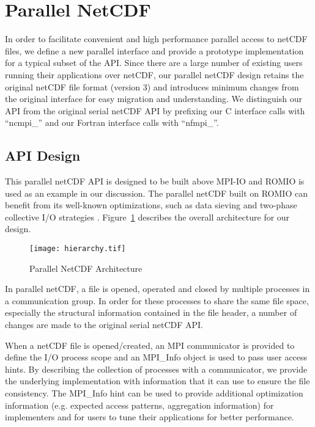 \documentclass[10pt,twocolumn]{article}          %
\begin{document}
\section{Parallel NetCDF}

In order to facilitate convenient and high performance parallel access to netCDF files, we define a
new parallel interface and provide a prototype implementation for a typical subset of the API.
Since there are a large number of existing users running their applications over netCDF, our
parallel netCDF design retains the original netCDF file format (version 3) and introduces minimum
changes from the original interface for easy migration and understanding. We distinguish our API
from the original serial netCDF API by prefixing our C interface calls with ``ncmpi\_'' and our
Fortran interface calls with ``nfmpi\_''.

\subsection{API Design}

This parallel netCDF API is designed to be built above MPI-IO and ROMIO is used as an example in
our discussion. The parallel netCDF built on ROMIO can benefit from its well-known optimizations,
such as data sieving and two-phase collective I/O strategies \cite{RoBC93, TBCP94, ThCh96,ThGL99}.
Figure~\ref{figure:hierarchy} describes the overall architecture for our design.

\begin{figure}
\begin{center}
\texttt{[image: hierarchy.tif]}
\end{center}
\vskip -0.1in \caption{Parallel NetCDF Architecture}
\label{figure:hierarchy}
\end{figure}

In parallel netCDF, a file is opened, operated and closed by
multiple processes in a communication group. In order for these
processes to share the same file space, especially the structural
information contained in the file header, a number of changes are
made to the original serial netCDF API.

When a netCDF file is opened/created, an MPI communicator is provided to define the I/O process
scope and an MPI\_Info object is used to pass user access hints. By describing the collection of
processes with a communicator, we provide the underlying implementation with information that it
can use to ensure the file consistency. The MPI\_Info hint can be used to provide additional
optimization information (e.g. expected access patterns, aggregation information) for implementers
and for users to tune their applications for better performance.
\end{document}
